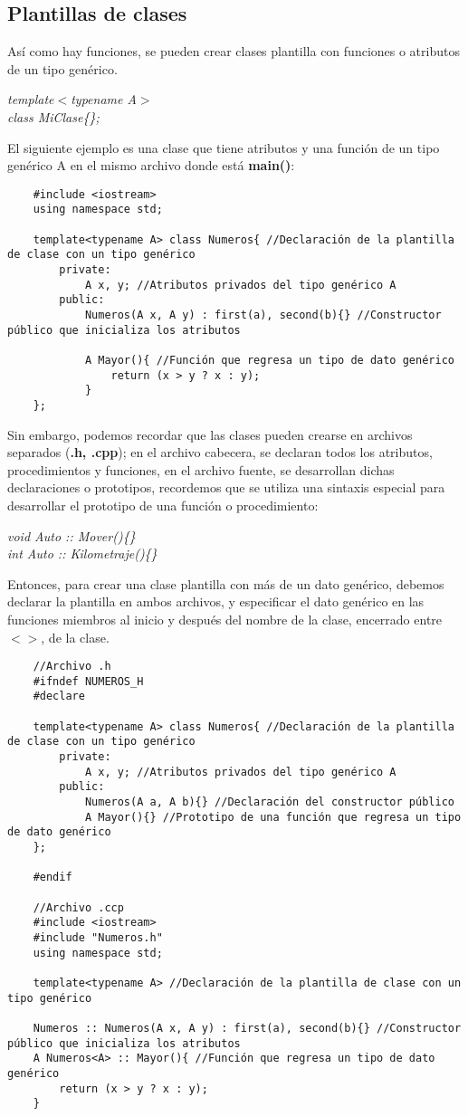 \subsection{Plantillas de clases}
Así como hay funciones, se pueden crear clases plantilla con funciones o atributos de un tipo genérico.\begin{center}\textit{template$<$typename A$>$\\class MiClase\{\};}\end{center}
El siguiente ejemplo es una clase que tiene atributos y una función de un tipo genérico A en el mismo archivo donde está \textbf{main()}:
\begin{lstlisting}
    #include <iostream>
    using namespace std;
    
    template<typename A> class Numeros{ //Declaración de la plantilla de clase con un tipo genérico
        private:
            A x, y; //Atributos privados del tipo genérico A
        public:
            Numeros(A x, A y) : first(a), second(b){} //Constructor público que inicializa los atributos
            
            A Mayor(){ //Función que regresa un tipo de dato genérico
                return (x > y ? x : y);
            }
    };
\end{lstlisting}
Sin embargo, podemos recordar que las clases pueden crearse en archivos separados (\textbf{.h, .cpp}); en el archivo cabecera, se declaran todos los atributos, procedimientos y funciones, en el archivo fuente, se desarrollan dichas declaraciones o prototipos, recordemos que se utiliza una sintaxis especial para desarrollar el prototipo de una función o procedimiento:\begin{center}\textit{void Auto :: Mover()\{\}\\int Auto :: Kilometraje()\{\}}\end{center}
Entonces, para crear una clase plantilla con más de un dato genérico, debemos declarar la plantilla en ambos archivos, y especificar el dato genérico en las funciones miembros al inicio y después del nombre de la clase, encerrado entre \textbf{$< >$}, de la clase. 
\begin{lstlisting}
    //Archivo .h
    #ifndef NUMEROS_H
    #declare
    
    template<typename A> class Numeros{ //Declaración de la plantilla de clase con un tipo genérico
        private:
            A x, y; //Atributos privados del tipo genérico A
        public:
            Numeros(A a, A b){} //Declaración del constructor público
            A Mayor(){} //Prototipo de una función que regresa un tipo de dato genérico
    };
    
    #endif
    
    //Archivo .ccp
    #include <iostream>
    #include "Numeros.h"
    using namespace std;
    
    template<typename A> //Declaración de la plantilla de clase con un tipo genérico
    
    Numeros :: Numeros(A x, A y) : first(a), second(b){} //Constructor público que inicializa los atributos
    A Numeros<A> :: Mayor(){ //Función que regresa un tipo de dato genérico
        return (x > y ? x : y);
    }
\end{lstlisting}
